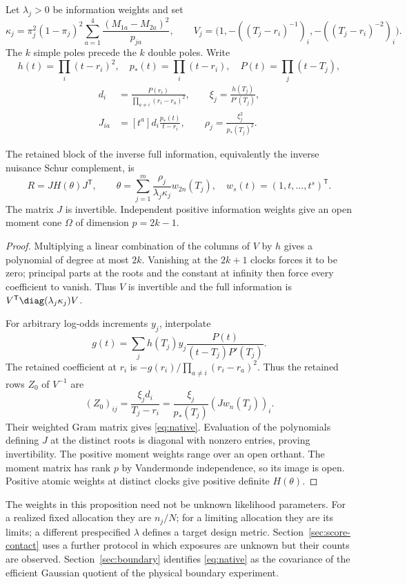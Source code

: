 Let $\lambda_j>0$ be information weights and set
\[
 \kappa_j=\pi_j^2(1-\pi_j)^2\sum_{a=1}^4
      \frac{(M_{1a}-M_{2a})^2}{p_{ja}},\qquad
 V_j=\big(1,-((T_j-r_i)^{-1})_i,-((T_j-r_i)^{-2})_i\big).
\]
The $k$ simple poles precede the $k$ double poles. Write
\[
 h(t)=\prod_i(t-r_i)^2,\quad p_*(t)=\prod_i(t-r_i),\quad P(t)=\prod_j(t-T_j),
\]
\begin{equation}\label{eq:nativeconstants}
 \begin{split}
 d_i&=\frac{P(r_i)}{\prod_{a\ne i}(r_i-r_a)^2},\qquad
 \xi_j=\frac{h(T_j)}{P'(T_j)},\\
 J_{ia}&=[t^a]d_i\frac{p_*(t)}{t-r_i},\qquad
 \rho_j=\frac{\xi_j^2}{p_*(T_j)^2}.
 \end{split}
\end{equation}
\begin{proposition}\label{prop:native}
The retained block of the inverse full information, equivalently the inverse nuisance Schur complement, is
\begin{equation}\label{eq:native}
 R=JH(\theta)J^{\mathsf T},\qquad
 \theta=\sum_{j=1}^m\frac{\rho_j}{\lambda_j\kappa_j}w_{2n}(T_j),
 \quad w_s(t)=(1,t,\ldots,t^s)^{\mathsf T}.
\end{equation}
The matrix $J$ is invertible. Independent positive information weights give an open moment cone $\Omega$ of dimension $p=2k-1$.
\end{proposition}
\begin{proof}
Multiplying a linear combination of the columns of $V$ by $h$ gives a polynomial of degree at most $2k$. Vanishing at the $2k+1$ clocks forces it to be zero; principal parts at the roots and the constant at infinity then force every coefficient to vanish. Thus $V$ is invertible and the full information is $V^{\mathsf T}\diag(\lambda_j\kappa_j)V$.

For arbitrary log-odds increments $y_j$, interpolate
\[
 g(t)=\sum_jh(T_j)y_j\frac{P(t)}{(t-T_j)P'(T_j)}.
\]
The retained coefficient at $r_i$ is $-g(r_i)/\prod_{a\ne i}(r_i-r_a)^2$. Thus the retained rows $Z_0$ of $V^{-1}$ are
\[
 (Z_0)_{ij}=\frac{\xi_jd_i}{T_j-r_i}
        =\frac{\xi_j}{p_*(T_j)}(Jw_n(T_j))_i.
\]
Their weighted Gram matrix gives \eqref{eq:native}. Evaluation of the polynomials defining $J$ at the distinct roots is diagonal with nonzero entries, proving invertibility. The positive moment weights range over an open orthant. The moment matrix has rank $p$ by Vandermonde independence, so its image is open. Positive atomic weights at distinct clocks give positive definite $H(\theta)$.
\end{proof}
The weights in this proposition need not be unknown likelihood parameters. For a realized fixed allocation they are $n_j/N$; for a limiting allocation they are its limits; a different prespecified $\lambda$ defines a target design metric. Section~\ref{sec:score-contact} uses a further protocol in which exposures are unknown but their counts are observed. Section~\ref{sec:boundary} identifies \eqref{eq:native} as the covariance of the efficient Gaussian quotient of the physical boundary experiment.
